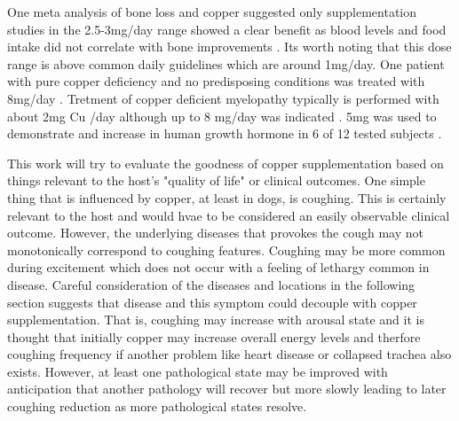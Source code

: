 {One meta analysis of bone loss and copper suggested only
supplementation studies in the 2.5-3mg/day range showed
a clear benefit as blood levels and food intake did not correlate
with bone improvements \cite{PMC8308383}. Its worth noting
that this dose range is above common daily guidelines which are  around 
1mg/day.
One patient with pure copper deficiency and no predisposing conditions
was treated with 8mg/day 
\cite{Klevay_Ux201c_char_2006}.
Tretment of copper deficient myelopathy typically is performed with
 about 2mg Cu /day although up to 8 mg/day was indicated
\cite{PMC3691478}.
5mg was used to demonstrate and increase in human growth hormone in
6 of 12 tested subjects \cite{PMID3203160}.


This work will try to evaluate the goodness of copper supplementation
based on things relevant to the host's  "quality of life"
or clinical outcomes.
One simple thing that is influenced by  copper, at least in dogs,
 is coughing.
This is certainly relevant to the host and would hvae to be considered
an easily observable clinical outcome. 
However, the underlying diseases that provokes the
cough may not monotonically correspond to coughing features.  
Coughing may be more common during excitement which does not
occur with a feeling of lethargy common in disease.
Careful consideration of the diseases and locations in the following
section
suggests that disease and this symptom
could decouple with copper supplementation. That is, coughing may 
increase with  arousal state
and it is thought that initially  copper may increase overall 
energy levels and therfore  coughing frequency if another problem
like heart disease or collapsed trachea also exists.
However, at least one pathological state
may be improved with anticipation that another pathology will
recover but more slowly leading to later coughing reduction as more
pathological states resolve. 

} %


